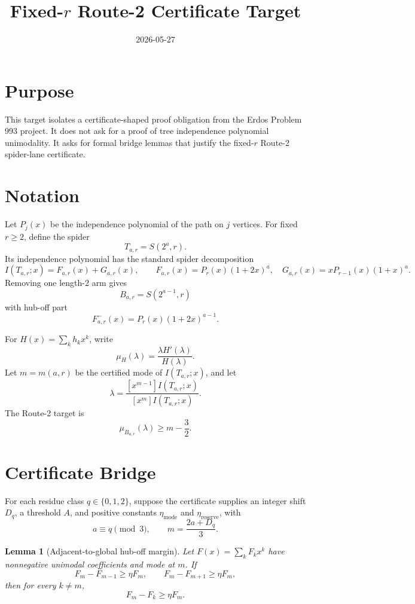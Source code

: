 \documentclass[11pt]{article}
\title{Fixed-\(r\) Route-2 Certificate Target}
\date{2026-05-27}
\newtheorem{lemma}{Lemma}
\begin{document}
\maketitle

\section{Purpose}

This target isolates a certificate-shaped proof obligation from the
Erdos Problem 993 project.  It does not ask for a proof of tree independence
polynomial unimodality.  It asks for formal bridge lemmas that justify the
fixed-\(r\) Route-2 spider-lane certificate.

\section{Notation}

Let \(P_j(x)\) be the independence polynomial of the path on \(j\) vertices.
For fixed \(r \ge 2\), define the spider
\[
  T_{a,r}=S(2^a,r).
\]
Its independence polynomial has the standard spider decomposition
\[
  I(T_{a,r};x)=F_{a,r}(x)+G_{a,r}(x),
  \qquad
  F_{a,r}(x)=P_r(x)(1+2x)^a,\quad
  G_{a,r}(x)=xP_{r-1}(x)(1+x)^a.
\]
Removing one length-\(2\) arm gives
\[
  B_{a,r}=S(2^{a-1},r)
\]
with hub-off part
\[
  F^-_{a,r}(x)=P_r(x)(1+2x)^{a-1}.
\]

For \(H(x)=\sum_k h_kx^k\), write
\[
  \mu_H(\lambda)=\frac{\lambda H'(\lambda)}{H(\lambda)}.
\]
Let \(m=m(a,r)\) be the certified mode of \(I(T_{a,r};x)\), and let
\[
  \lambda=\frac{[x^{m-1}]I(T_{a,r};x)}{[x^m]I(T_{a,r};x)}.
\]
The Route-2 target is
\[
  \mu_{B_{a,r}}(\lambda)\ge m-\frac32.
\]

\section{Certificate Bridge}

For each residue class \(q\in\{0,1,2\}\), suppose the certificate supplies
an integer shift \(D_q\), a threshold \(A\), and positive constants
\(\eta_{\mathrm{mode}}\) and \(\eta_{\mathrm{reserve}}\), with
\[
  a\equiv q\pmod 3,\qquad m=\frac{2a+D_q}{3}.
\]

\begin{lemma}[Adjacent-to-global hub-off margin]
Let \(F(x)=\sum_k F_kx^k\) have nonnegative unimodal coefficients and mode
at \(m\).  If
\[
  F_m-F_{m-1}\ge \eta F_m,\qquad
  F_m-F_{m+1}\ge \eta F_m,
\]
then for every \(k\ne m\),
\[
  F_m-F_k\ge \eta F_m.
\]
\end{lemma}
\end{document}
